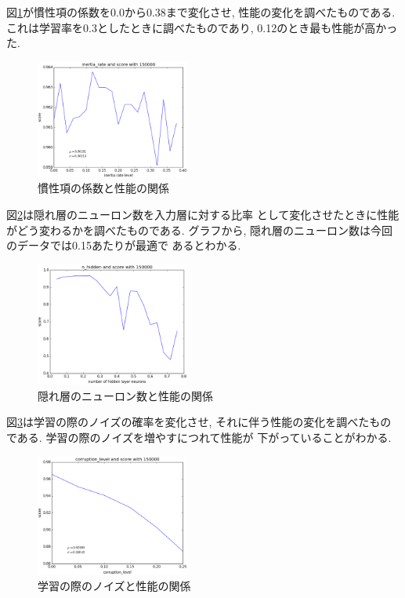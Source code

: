 \documentclass[10pt,a4paper,twocolumn]{jarticle}
\begin{document}
図\ref{fig:inertia-rate-test}が慣性項の係数を0.0から0.38まで変化させ, 
性能の変化を調べたものである. 
これは学習率を0.3としたときに調べたものであり, 
0.12のとき最も性能が高かった. 
\begin{figure}[htbp]
  \centering
  \includegraphics[width=0.45\textwidth]{assets/img/inertia_rate_test_mnist.eps}
  \caption{慣性項の係数と性能の関係}
  \label{fig:inertia-rate-test}
\end{figure}

図\ref{fig:hidden-layer-analyze}は隠れ層のニューロン数を入力層に対する比率
として変化させたときに性能がどう変わるかを調べたものである. 
グラフから, 隠れ層のニューロン数は今回のデータでは0.15あたりが最適で
あるとわかる. 
\begin{figure}[htbp]
  \centering
  \includegraphics[width=0.45\textwidth]{assets/img/n_hidden_test_mnist_score.eps}
  \caption{隠れ層のニューロン数と性能の関係}
  \label{fig:hidden-layer-analyze}
\end{figure}

図\ref{fig:corruption-level-test}は学習の際のノイズの確率を変化させ, 
それに伴う性能の変化を調べたものである. 学習の際のノイズを増やすにつれて性能が
下がっていることがわかる. 
\begin{figure}[htbp]
  \centering
  \includegraphics[width=0.45\textwidth]{assets/img/corruption_level_test_mnist.eps}
  \caption{学習の際のノイズと性能の関係}
  \label{fig:corruption-level-test}
\end{figure}
\end{document}
